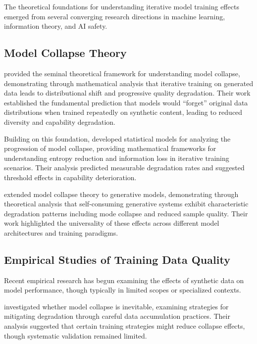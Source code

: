 \documentclass[11pt]{article}
\begin{document}
The theoretical foundations for understanding iterative model training effects emerged from several converging research directions in machine learning, information theory, and AI safety.

\subsection{Model Collapse Theory}

\citet{shumailov2023curse} provided the seminal theoretical framework for understanding model collapse, demonstrating through mathematical analysis that iterative training on generated data leads to distributional shift and progressive quality degradation. Their work established the fundamental prediction that models would ``forget'' original data distributions when trained repeatedly on synthetic content, leading to reduced diversity and capability degradation.

Building on this foundation, \citet{seddik2024bad} developed statistical models for analyzing the progression of model collapse, providing mathematical frameworks for understanding entropy reduction and information loss in iterative training scenarios. Their analysis predicted measurable degradation rates and suggested threshold effects in capability deterioration.

\citet{alemohammad2023self} extended model collapse theory to generative models, demonstrating through theoretical analysis that self-consuming generative systems exhibit characteristic degradation patterns including mode collapse and reduced sample quality. Their work highlighted the universality of these effects across different model architectures and training paradigms.

\subsection{Empirical Studies of Training Data Quality}

Recent empirical research has begun examining the effects of synthetic data on model performance, though typically in limited scopes or specialized contexts.

\citet{gerstgrasser2024model} investigated whether model collapse is inevitable, examining strategies for mitigating degradation through careful data accumulation practices. Their analysis suggested that certain training strategies might reduce collapse effects, though systematic validation remained limited.
\end{document}
